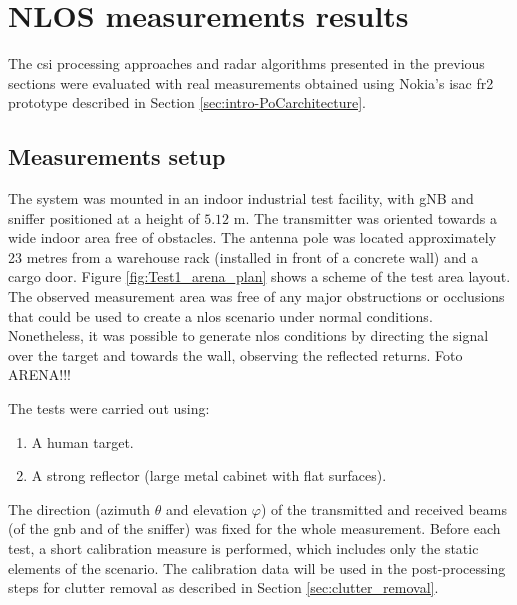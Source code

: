 \chapter{NLOS measurements results}

The \gls{csi} processing approaches and radar algorithms presented in the previous sections were evaluated with real measurements obtained using Nokia's \gls{isac} \gls{fr2} prototype described in Section \ref{sec:intro-PoCarchitecture}.

\section{Measurements setup}
\label{sec:Test1_meas_scenario}

The system was mounted in an indoor industrial test facility, with gNB and sniffer positioned at a height of $5.12$ m. The transmitter was oriented towards a wide  indoor area free of obstacles. The antenna pole was located approximately 23 metres from a warehouse rack (installed in front of a concrete wall) and a cargo door.
Figure \ref{fig:Test1_arena_plan} shows a scheme of the test area layout.
The observed measurement area was free of any major obstructions or occlusions that could be used to create a \gls{nlos} scenario under normal conditions.
Nonetheless, it was possible to generate \gls{nlos} conditions by directing the signal over the target and towards the wall, observing the reflected returns.
\alert{Foto ARENA!!!}

 
The tests were carried out using:

\begin{enumerate}
	\item A human target.
	\item A strong reflector (large metal cabinet with flat surfaces).
\end{enumerate}

The direction (azimuth $\theta$ and elevation $\varphi$) of the transmitted and received beams (\ie of the \gls{gnb} and of the sniffer) was fixed for the whole measurement.
Before each test, a short calibration measure is performed, which includes only the static elements of the scenario. The calibration data will be used in the post-processing steps for clutter removal as described in Section \ref{sec:clutter_removal}.

